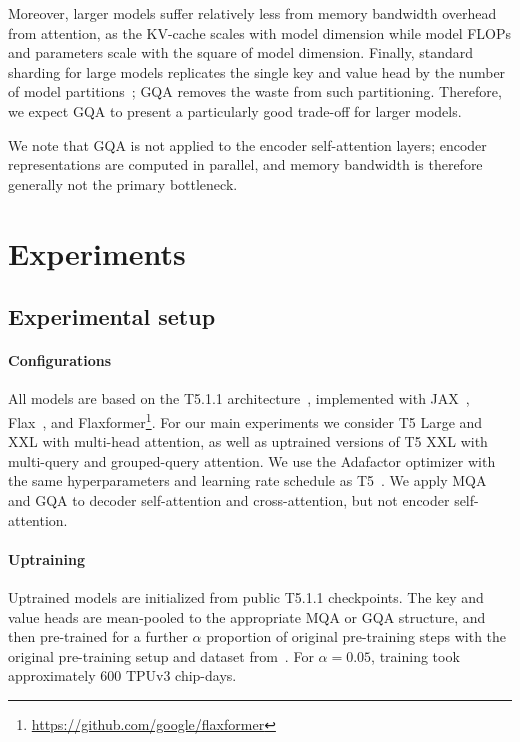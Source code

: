 Moreover, larger models suffer relatively less from memory bandwidth overhead from attention, as the KV-cache scales with model dimension while model FLOPs and parameters scale with the square of model dimension. Finally, standard sharding for large models replicates the single key and value head by the number of model partitions~\citep{palminference}; \textsc{GQA} removes the waste from such partitioning. Therefore, we expect \textsc{GQA} to present a particularly good trade-off for larger models. 

We note that \textsc{GQA} is not applied to the encoder self-attention layers; encoder representations are computed in parallel, and memory bandwidth is therefore generally not the primary bottleneck.

\section{Experiments}
\label{section:experiments}

\subsection{Experimental setup}

\paragraph{Configurations}
All models are based on the T5.1.1 architecture~\citep{t5}, implemented with JAX~\citep{jax}, Flax~\citep{flax}, and Flaxformer\footnote{\url{https://github.com/google/flaxformer}}. For our main experiments we consider T5 Large and XXL with multi-head attention, as well as uptrained versions of T5 XXL with multi-query and grouped-query attention. We use the Adafactor optimizer with the same hyperparameters and learning rate schedule as T5~\citep{t5}. We apply \textsc{MQA} and \textsc{GQA} to decoder self-attention and cross-attention, but not encoder self-attention.

\paragraph{Uptraining}

Uptrained models are initialized from public T5.1.1 checkpoints. The key and value heads are mean-pooled to the appropriate \textsc{MQA} or \textsc{GQA} structure, and then pre-trained for a further 
$\alpha$ proportion of original pre-training steps with the original pre-training setup and dataset from~\citep{t5}. For $\alpha=0.05$, training took approximately 600 TPUv3 chip-days.

